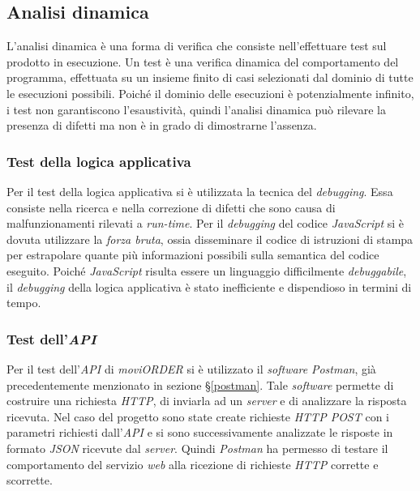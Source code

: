 \subsection{Analisi dinamica}

L'analisi dinamica è una forma di verifica che consiste nell'effettuare test sul prodotto in esecuzione. Un test è una verifica dinamica del comportamento del programma, effettuata su un insieme finito di casi selezionati dal dominio di tutte le esecuzioni possibili. Poiché il dominio delle esecuzioni è potenzialmente infinito, i test non garantiscono l'esaustività, quindi l'analisi dinamica può rilevare la presenza di difetti ma non è in grado di dimostrarne l'assenza.

\subsubsection{Test della logica applicativa}

Per il test della logica applicativa si è utilizzata la tecnica del \textit{debugging}. Essa consiste nella ricerca e nella correzione di difetti che sono causa di malfunzionamenti rilevati a \textit{run-time}. Per il \textit{debugging} del codice \textit{JavaScript} si è dovuta utilizzare la \textit{forza bruta}, ossia disseminare il codice di istruzioni di stampa per estrapolare quante più informazioni possibili sulla semantica del codice eseguito. Poiché \textit{JavaScript} risulta essere un linguaggio difficilmente \textit{debuggabile}, il \textit{debugging} della logica applicativa è stato inefficiente e dispendioso in termini di tempo.

\subsubsection{Test dell'\textit{API}}

Per il test dell'\textit{API} di \textit{moviORDER} si è utilizzato il \textit{software} \textit{Postman}, già precedentemente menzionato in sezione §\ref{postman}. Tale \textit{software} permette di costruire una richiesta \textit{HTTP}, di inviarla ad un \textit{server} e di analizzare la risposta ricevuta. Nel caso del progetto sono state create richieste \textit{HTTP POST} con i parametri richiesti dall'\textit{API} e si sono successivamente analizzate le risposte in formato \textit{JSON} ricevute dal \textit{server}.
Quindi \textit{Postman} ha permesso di testare il comportamento del servizio \textit{web} alla ricezione di richieste \textit{HTTP} corrette e scorrette.

